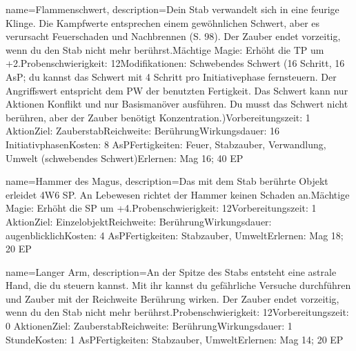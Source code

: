{
    name={Flammenschwert},
    description={Dein Stab verwandelt sich in eine feurige Klinge. Die Kampfwerte entsprechen einem gewöhnlichen Schwert, aber es verursacht Feuerschaden und Nachbrennen (S. 98). Der Zauber endet vorzeitig, wenn du den Stab nicht mehr berührst.\newline Mächtige Magie: Erhöht die TP um +2.\newline Probenschwierigkeit: 12\newline Modifikationen: Schwebendes Schwert (16 Schritt, 16 AsP; du kannst das Schwert mit 4 Schritt pro Initiativephase fernsteuern. Der Angriffswert entspricht dem PW der benutzten Fertigkeit. Das Schwert kann nur Aktionen Konflikt und nur Basismanöver ausführen. Du musst das Schwert nicht berühren, aber der Zauber benötigt Konzentration.)\newline Vorbereitungszeit: 1 Aktion\newline Ziel: Zauberstab\newline Reichweite: Berührung\newline Wirkungsdauer: 16 Initiativphasen\newline Kosten: 8 AsP\newline Fertigkeiten: Feuer, Stabzauber, Verwandlung, Umwelt (schwebendes Schwert)\newline Erlernen: Mag 16; 40 EP}
}


{
    name={Hammer des Magus},
    description={Das mit dem Stab berührte Objekt erleidet 4W6 SP. An Lebewesen richtet der Hammer keinen Schaden an.\newline Mächtige Magie: Erhöht die SP um +4.\newline Probenschwierigkeit: 12\newline Vorbereitungszeit: 1 Aktion\newline Ziel: Einzelobjekt\newline Reichweite: Berührung\newline Wirkungsdauer: augenblicklich\newline Kosten: 4 AsP\newline Fertigkeiten: Stabzauber, Umwelt\newline Erlernen: Mag 18; 20 EP}
}


{
    name={Langer Arm},
    description={An der Spitze des Stabs entsteht eine astrale Hand, die du steuern kannst. Mit ihr kannst du gefährliche Versuche durchführen und Zauber mit der Reichweite Berührung wirken. Der Zauber endet vorzeitig, wenn du den Stab nicht mehr berührst.\newline Probenschwierigkeit: 12\newline Vorbereitungszeit: 0 Aktionen\newline Ziel: Zauberstab\newline Reichweite: Berührung\newline Wirkungsdauer: 1 Stunde\newline Kosten: 1 AsP\newline Fertigkeiten: Stabzauber, Umwelt\newline Erlernen: Mag 14; 20 EP}
}


